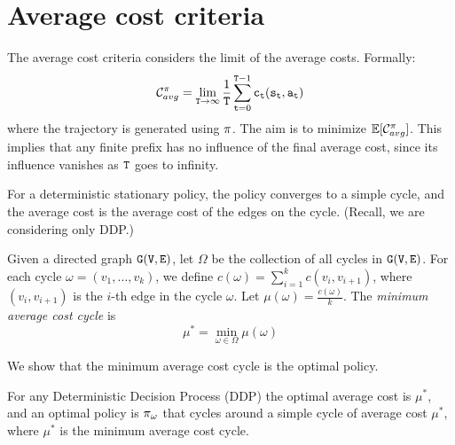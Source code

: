 \section{Average cost criteria}

The average cost criteria considers the limit of the average costs.
Formally:
\[
\mathcal{C}_{avg}^\pi=\lim_{{\tt T}\rightarrow \infty}
\frac{1}{{\tt T}} \sum_{{\tt t}=0}^{{\tt T}-1}
{\tt c}_{\tt t}({\tt s}_{\tt t},{\tt a}_{\tt t})
\]
where the trajectory is generated using $\pi$. The aim is to
minimize $\mathbb{E}[\mathcal{C}^\pi_{avg}]$. This implies that any finite
prefix has no influence of the final average cost, since its
influence vanishes as ${\tt T}$ goes to infinity.

For a deterministic stationary policy, the policy converges to a
simple cycle, and the average cost is the average cost of the edges
on the cycle. (Recall, we are considering only DDP.)

Given a directed graph ${\tt G}({\tt V},{\tt E})$, let $\Omega$ be the collection of
all cycles in ${\tt G}({\tt V},{\tt E})$. For each cycle $\omega=(v_1, \ldots ,
v_{k})$, we define $c(\omega)=\sum_{i=1}^k c(v_i,v_{i+1})$, where
$(v_i,v_{i+1})$ is the $i$-th edge in the cycle $\omega$. Let
$\mu(\omega)=\frac{c(\omega)}{k}$. The {\em minimum average cost cycle}
is
\[
\mu^*=\min_{\omega\in\Omega} \mu(\omega)
\]

We show that the minimum average cost cycle is the optimal policy.
\begin{theorem}
For any Deterministic Decision Process (DDP) the optimal average
cost is $\mu^*$, and an optimal policy is $\pi_{\omega}$ that
cycles around a simple cycle of average cost $\mu^*$, where $\mu^*$ is the minimum average cost cycle.
\end{theorem}

